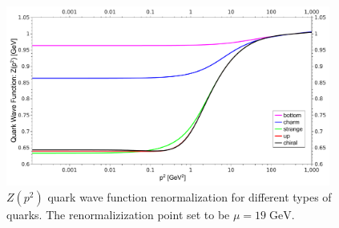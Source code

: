 %
\begin{figure}
\tiny
 \begin{center}
  \includegraphics[width=0.95\textwidth]{figures/quark_Z_functions}
 \end{center}
 \caption{\footnotesize $Z(p^2)$ quark wave function renormalization for different types of quarks. The renormalizization point set to be $\mu=19\;\text{GeV}$. }\label{fig:quark_Z_func} 
\end{figure}


